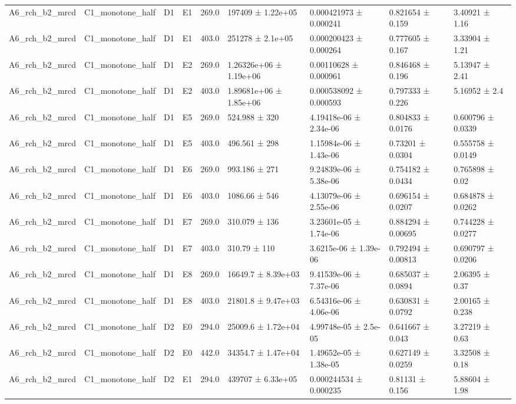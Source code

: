 \begin{table}
\begin{tabular}{lllllllll}
A6\_rch\_b2\_mrcd & C1\_monotone\_half & D1 & E1 & 269.0 & 197409 ± 1.22e+05 & 0.000421973 ± 0.000241 & 0.821654 ± 0.159 & 3.40921 ± 1.16 \\
A6\_rch\_b2\_mrcd & C1\_monotone\_half & D1 & E1 & 403.0 & 251278 ± 2.1e+05 & 0.000200423 ± 0.000264 & 0.777605 ± 0.167 & 3.33904 ± 1.21 \\
A6\_rch\_b2\_mrcd & C1\_monotone\_half & D1 & E2 & 269.0 & 1.26326e+06 ± 1.19e+06 & 0.00110628 ± 0.000961 & 0.846468 ± 0.196 & 5.13947 ± 2.41 \\
A6\_rch\_b2\_mrcd & C1\_monotone\_half & D1 & E2 & 403.0 & 1.89681e+06 ± 1.85e+06 & 0.000538092 ± 0.000593 & 0.797333 ± 0.226 & 5.16952 ± 2.4 \\
A6\_rch\_b2\_mrcd & C1\_monotone\_half & D1 & E5 & 269.0 & 524.988 ± 320 & 4.19418e-06 ± 2.34e-06 & 0.804833 ± 0.0176 & 0.600796 ± 0.0339 \\
A6\_rch\_b2\_mrcd & C1\_monotone\_half & D1 & E5 & 403.0 & 496.561 ± 298 & 1.15984e-06 ± 1.43e-06 & 0.73201 ± 0.0304 & 0.555758 ± 0.0149 \\
A6\_rch\_b2\_mrcd & C1\_monotone\_half & D1 & E6 & 269.0 & 993.186 ± 271 & 9.24839e-06 ± 5.38e-06 & 0.754182 ± 0.0434 & 0.765898 ± 0.02 \\
A6\_rch\_b2\_mrcd & C1\_monotone\_half & D1 & E6 & 403.0 & 1086.66 ± 546 & 4.13079e-06 ± 2.55e-06 & 0.696154 ± 0.0207 & 0.684878 ± 0.0262 \\
A6\_rch\_b2\_mrcd & C1\_monotone\_half & D1 & E7 & 269.0 & 310.079 ± 136 & 3.23601e-05 ± 1.74e-06 & 0.884294 ± 0.00695 & 0.744228 ± 0.0277 \\
A6\_rch\_b2\_mrcd & C1\_monotone\_half & D1 & E7 & 403.0 & 310.79 ± 110 & 3.6215e-06 ± 1.39e-06 & 0.792494 ± 0.00813 & 0.690797 ± 0.0206 \\
A6\_rch\_b2\_mrcd & C1\_monotone\_half & D1 & E8 & 269.0 & 16649.7 ± 8.39e+03 & 9.41539e-06 ± 7.37e-06 & 0.685037 ± 0.0894 & 2.06395 ± 0.37 \\
A6\_rch\_b2\_mrcd & C1\_monotone\_half & D1 & E8 & 403.0 & 21801.8 ± 9.47e+03 & 6.54316e-06 ± 4.06e-06 & 0.630831 ± 0.0792 & 2.00165 ± 0.238 \\
A6\_rch\_b2\_mrcd & C1\_monotone\_half & D2 & E0 & 294.0 & 25009.6 ± 1.72e+04 & 4.99748e-05 ± 2.5e-05 & 0.641667 ± 0.043 & 3.27219 ± 0.63 \\
A6\_rch\_b2\_mrcd & C1\_monotone\_half & D2 & E0 & 442.0 & 34354.7 ± 1.47e+04 & 1.49652e-05 ± 1.38e-05 & 0.627149 ± 0.0259 & 3.32508 ± 0.18 \\
A6\_rch\_b2\_mrcd & C1\_monotone\_half & D2 & E1 & 294.0 & 439707 ± 6.33e+05 & 0.000244534 ± 0.000235 & 0.81131 ± 0.156 & 5.88604 ± 1.98 \\

\end{tabular}
\end{table}
